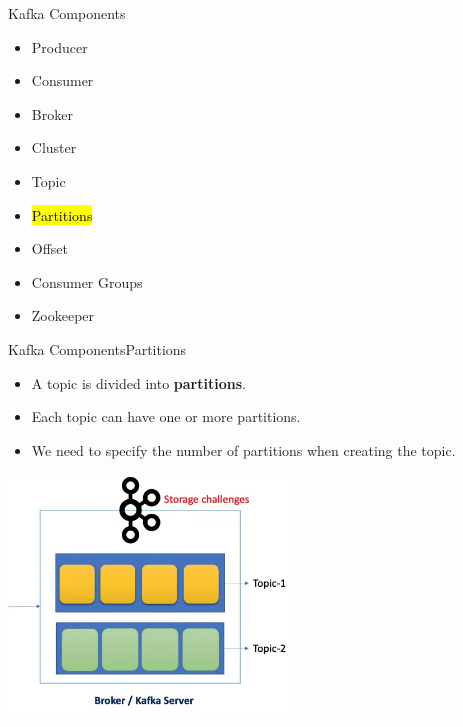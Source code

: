 \documentclass{beamer}
\begin{document}
\begin{frame}{Kafka Components}
  \begin{itemize}
    \item Producer
    \item Consumer
    \item Broker
    \item Cluster
    \item Topic
    \item \hl{Partitions}
    \item Offset
    \item Consumer Groups
    \item Zookeeper
  \end{itemize}
\end{frame}

\begin{frame}{Kafka Components}{Partitions}
  \begin{itemize}
    \item A topic is divided into \textbf{partitions}.
    \item Each topic can have one or more partitions.
    \item We need to specify the number of partitions when creating the topic.
  \end{itemize}
  \hspace*{5em}
  \includegraphics[width=0.57\textwidth]{fig/partitions.png}
\end{frame}
\end{document}
